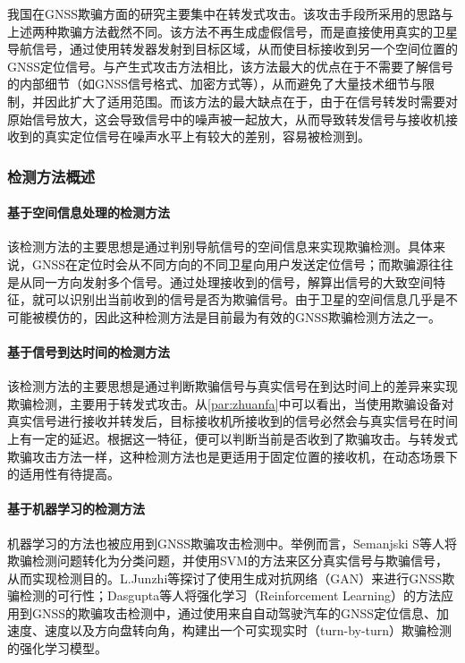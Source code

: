 我国在GNSS欺骗方面的研究主要集中在转发式攻击。该攻击手段所采用的思路与上述两种欺骗方法截然不同。该方法不再生成虚假信号，而是直接使用真实的卫星导航信号，通过使用转发器发射到目标区域，从而使目标接收到另一个空间位置的GNSS定位信号。与产生式攻击方法相比，该方法最大的优点在于不需要了解信号的内部细节（如GNSS信号格式、加密方式等），从而避免了大量技术细节与限制，并因此扩大了适用范围。而该方法的最大缺点在于，由于在信号转发时需要对原始信号放大，这会导致信号中的噪声被一起放大，从而导致转发信号与接收机接收到的真实定位信号在噪声水平上有较大的差别，容易被检测到。
\subsubsection{检测方法概述}
\label{sec:jiance}
\paragraph{基于空间信息处理的检测方法}

该检测方法的主要思想是通过判别导航信号的空间信息来实现欺骗检测。具体来说，GNSS在定位时会从不同方向的不同卫星向用户发送定位信号；而欺骗源往往是从同一方向发射多个信号。通过处理接收到的信号，解算出信号的大致空间特征，就可以识别出当前收到的信号是否为欺骗信号。由于卫星的空间信息几乎是不可能被模仿的，因此这种检测方法是目前最为有效的GNSS欺骗检测方法之一。
\paragraph{基于信号到达时间的检测方法}

该检测方法的主要思想是通过判断欺骗信号与真实信号在到达时间上的差异来实现欺骗检测，主要用于转发式攻击。从\ref{par:zhuanfa}中可以看出，当使用欺骗设备对真实信号进行接收并转发后，目标接收机所接收到的信号必然会与真实信号在时间上有一定的延迟。根据这一特征，便可以判断当前是否收到了欺骗攻击。与转发式欺骗攻击方法一样，这种检测方法也是更适用于固定位置的接收机，在动态场景下的适用性有待提高。

\paragraph{基于机器学习的检测方法}
机器学习的方法也被应用到GNSS欺骗攻击检测中。举例而言，Semanjski S等人\cite{semanjski2020gnss}将欺骗检测问题转化为分类问题，并使用SVM的方法来区分真实信号与欺骗信号，从而实现检测目的。L.Junzhi等\cite{Junzhi2019gan}探讨了使用生成对抗网络（GAN）来进行GNSS欺骗检测的可行性；Dasgupta等人\cite{dasgupta2021reinforcement}将强化学习（Reinforcement Learning）的方法应用到GNSS的欺骗攻击检测中，通过使用来自自动驾驶汽车的GNSS定位信息、加速度、速度以及方向盘转向角，构建出一个可实现实时（turn-by-turn）欺骗检测的强化学习模型。


